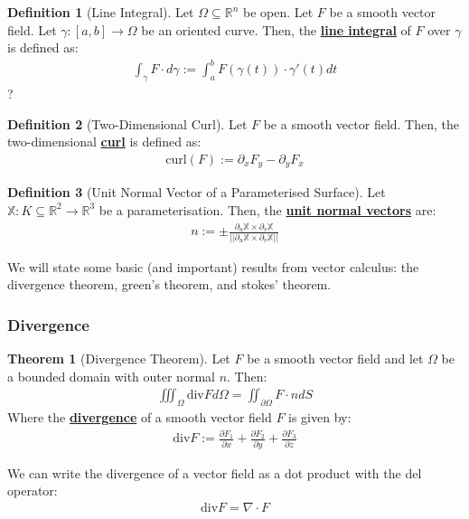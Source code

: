 \documentclass[11pt]{scrartcl}
\newcommand{\R}[0]{\mathbb{R}}
\theoremstyle{definition}
\newtheorem{theorem}{Theorem}
\newtheorem{definition}{Definition}
\theoremstyle{remark}
\newcommand{\dfn}[1]{\textbf{\underline{#1}}}
\newcommand{\idx}[2]{\int_{#1}^{#2}}
\begin{document}
{\begin{definition}[Line Integral]
	Let $\Omega \subseteq \R^n$ be open. Let $F$ be a smooth vector field. Let $\gamma: [a,b] \rightarrow \Omega$ be an oriented curve. Then, the \dfn{line integral} of $F$ over $\gamma$ is defined as: 
	\begin{align*}
		\idx{\gamma}{} F \cdot d\gamma := \idx{a}{b} F(\gamma(t)) \cdot \gamma'(t) dt 
	\end{align*}?
	 
\end{definition}

\begin{definition}[Two-Dimensional Curl]
	Let $F$ be a smooth vector field. Then, the two-dimensional \dfn{curl} is defined as: 
	\begin{align*}
		\text{curl} (F) := \partial_x F_y - \partial_y F_x 
	\end{align*}
\end{definition}


\begin{definition}[Unit Normal Vector of a Parameterised Surface] 
	Let $\mathbb{X}: K \subseteq \R^2 \rightarrow \R^3$ be a parameterisation. Then, the \dfn{unit normal vectors} are: 
	\begin{align*}
		n := \pm \frac{\partial_u \mathbb{X} \times \partial_v \mathbb{X}}{|| \partial_u \mathbb{X} \times \partial_v \mathbb{X} ||}
	\end{align*}
\end{definition}

We will state some basic (and important) results from vector calculus: the divergence theorem, green's theorem, and stokes' theorem. 
\subsubsection{Divergence}
\begin{theorem}[Divergence Theorem]
Let $F$ be a smooth vector field and let $\Omega$ be a bounded domain with outer normal $n$. Then: 
\begin{align}
	\iiint_{\Omega} \text{div}F d \Omega = \iint_{\partial \Omega} F \cdot n dS	
\end{align}
Where the \dfn{divergence} of a smooth vector field $F$ is given by: 
\begin{align*}
	\text{div} F := \frac{\partial F_1}{\partial x} + \frac{\partial F_2}{\partial y} + \frac{\partial F_3}{\partial z}
\end{align*}
\end{theorem}
We can write the divergence of a vector field as a dot product with the del operator: 
\begin{align*}
	\text{div} F = \nabla \cdot F 
\end{align*}

}
\end{document}
